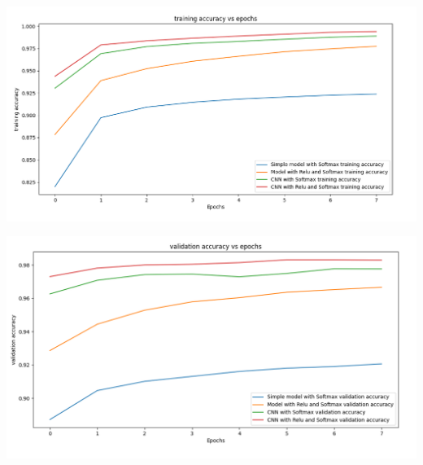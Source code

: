 \documentclass{article}
\begin{document}
\hspace{-0.3in}
\begin{minipage}{0.52\linewidth}
\includegraphics[width = \linewidth]{Training_accuracy.png}
\end{minipage}
\begin{minipage}{0.52\linewidth}
\includegraphics[width = \linewidth]{Validation_accuracy.png}
\end{minipage}
\end{document}
